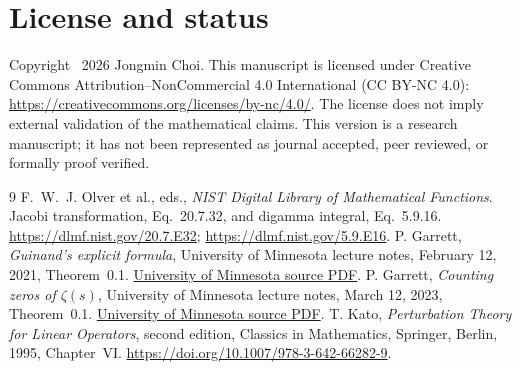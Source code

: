 \documentclass[11pt,a4paper]{article}
\numberwithin{equation}{section}
\theoremstyle{remark}\newtheorem{remark}[theorem]{Remark}
\begin{document}
\appendix






\section*{License and status}
Copyright \textcopyright\ 2026 Jongmin Choi.
This manuscript is licensed under Creative Commons Attribution--NonCommercial 4.0 International
(CC BY-NC 4.0): \url{https://creativecommons.org/licenses/by-nc/4.0/}.
The license does not imply external validation of the mathematical claims.
This version is a research manuscript; it has not been represented as journal accepted, peer reviewed, or formally proof verified.

\begingroup\small
\begin{thebibliography}{9}
F.~W.~J. Olver et al., eds., \emph{NIST Digital Library of Mathematical Functions}.
Jacobi transformation, Eq.~20.7.32, and digamma integral, Eq.~5.9.16.
\url{https://dlmf.nist.gov/20.7.E32};
\url{https://dlmf.nist.gov/5.9.E16}.
P. Garrett, \emph{Guinand's explicit formula},
University of Minnesota lecture notes, February 12, 2021, Theorem~0.1.
\newline
\href{https://www-users.cse.umn.edu/~garrett/m/complex/notes_2020-21/12g_guinand_explicit_fml.pdf}{University of Minnesota source PDF}.
P. Garrett, \emph{Counting zeros of $\zeta(s)$},
University of Minnesota lecture notes, March 12, 2023, Theorem~0.1.
\newline
\href{https://www-users.cse.umn.edu/~garrett/m/complex/notes_2021-22/12c_counting_zeros.pdf}{University of Minnesota source PDF}.
T. Kato, \emph{Perturbation Theory for Linear Operators},
second edition, Classics in Mathematics, Springer, Berlin, 1995, Chapter~VI.
\url{https://doi.org/10.1007/978-3-642-66282-9}.
\end{thebibliography}\endgroup
\end{document}
